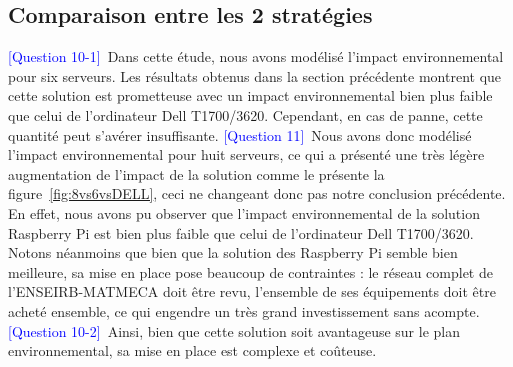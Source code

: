 \documentclass[12pt,a4paper]{paper}
\begin{document}
\subsection{Comparaison entre les 2 stratégies}
\textcolor{blue}{[Question 10-1]}~Dans cette étude, nous avons modélisé l'impact environnemental pour six serveurs. Les résultats obtenus dans la section précédente montrent que cette solution est prometteuse avec un impact environnemental bien plus faible que celui de l'ordinateur Dell T1700/3620. Cependant, en cas de panne, cette quantité peut s'avérer insuffisante. \textcolor{blue}{[Question 11]}~Nous avons donc modélisé l'impact environnemental pour huit serveurs, ce qui a présenté une très légère augmentation de l'impact de la solution comme le présente la figure~\ref{fig:8vs6vsDELL}, ceci ne changeant donc pas notre conclusion précédente. En effet, nous avons pu observer que l'impact environnemental de la solution Raspberry Pi est bien plus faible que celui de l'ordinateur Dell T1700/3620.\\
Notons néanmoins que bien que la solution des Raspberry Pi semble bien meilleure, sa mise en place pose beaucoup de contraintes : le réseau complet de l'ENSEIRB-MATMECA doit être revu, l'ensemble de ses équipements doit être acheté ensemble, ce qui engendre un très grand investissement sans acompte. \\
\textcolor{blue}{[Question 10-2]}~Ainsi, bien que cette solution soit avantageuse sur le plan environnemental, sa mise en place est complexe et coûteuse.\\
\end{document}

